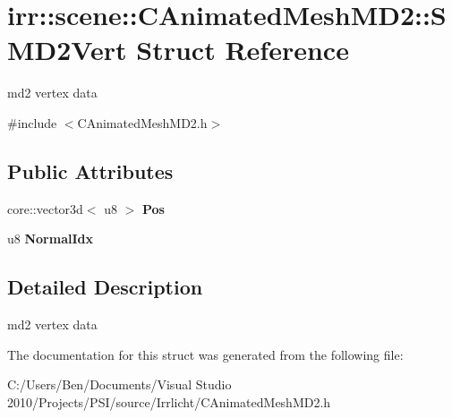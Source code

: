 \hypertarget{structirr_1_1scene_1_1_c_animated_mesh_m_d2_1_1_s_m_d2_vert}{\section{irr\-:\-:scene\-:\-:C\-Animated\-Mesh\-M\-D2\-:\-:S\-M\-D2\-Vert Struct Reference}
\label{structirr_1_1scene_1_1_c_animated_mesh_m_d2_1_1_s_m_d2_vert}
}


md2 vertex data  




{\ttfamily \#include $<$C\-Animated\-Mesh\-M\-D2.\-h$>$}

\subsection*{Public Attributes}
\begin{DoxyCompactItemize}
\item 
\hypertarget{structirr_1_1scene_1_1_c_animated_mesh_m_d2_1_1_s_m_d2_vert_aab2c6e2cbfd1de79a222393b9bae2a99}{core\-::vector3d$<$ u8 $>$ {\bfseries Pos}}\label{structirr_1_1scene_1_1_c_animated_mesh_m_d2_1_1_s_m_d2_vert_aab2c6e2cbfd1de79a222393b9bae2a99}

\item 
\hypertarget{structirr_1_1scene_1_1_c_animated_mesh_m_d2_1_1_s_m_d2_vert_a5cb6e26779bc2395470bd837aeb806f6}{u8 {\bfseries Normal\-Idx}}\label{structirr_1_1scene_1_1_c_animated_mesh_m_d2_1_1_s_m_d2_vert_a5cb6e26779bc2395470bd837aeb806f6}

\end{DoxyCompactItemize}


\subsection{Detailed Description}
md2 vertex data 

The documentation for this struct was generated from the following file\-:\begin{DoxyCompactItemize}
\item 
C\-:/\-Users/\-Ben/\-Documents/\-Visual Studio 2010/\-Projects/\-P\-S\-I/source/\-Irrlicht/C\-Animated\-Mesh\-M\-D2.\-h\end{DoxyCompactItemize}
